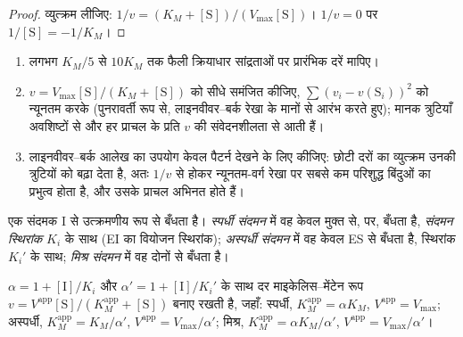 \begin{proof}
व्युत्क्रम लीजिए: $1/v = (K_M + [\mathrm S])/(V_{\max}[\mathrm S])$। $1/v = 0$ पर $1/[\mathrm S] = -1/K_M$।
\end{proof}

\begin{method}\label{met:b3:complex-kinetics:mm-fit}
\begin{enumerate}
  \item लगभग $K_M/5$ से $10K_M$ तक फैली क्रियाधार सांद्रताओं पर
        प्रारंभिक दरें मापिए।
  \item $v = V_{\max}[\mathrm S]/(K_M + [\mathrm S])$ को सीधे समंजित कीजिए, $\sum(v_i - v(\mathrm S_i))^2$ को न्यूनतम करके (पुनरावर्ती रूप से,
        लाइनवीवर--बर्क रेखा के मानों से आरंभ करते हुए); मानक
        त्रुटियाँ अवशिष्टों से और हर प्राचल के प्रति $v$ की
        संवेदनशीलता से आती हैं।
  \item लाइनवीवर--बर्क आलेख का उपयोग केवल पैटर्न देखने के लिए कीजिए: छोटी
        दरों का व्युत्क्रम उनकी त्रुटियों को बढ़ा देता है, अतः $1/v$ से होकर न्यूनतम-वर्ग रेखा
        पर सबसे कम परिशुद्ध बिंदुओं का प्रभुत्व होता है, और उसके प्राचल
        अभिनत होते हैं।
\end{enumerate}
\end{method}

\begin{definition}[संदमन]\label{def:b3:complex-kinetics:inhibition}
एक संदमक I  से उत्क्रमणीय रूप से बँधता है। \emph{स्पर्धी
संदमन} में वह केवल मुक्त  से,  पर, बँधता है, \emph{संदमन स्थिरांक} $K_i$ के साथ
(EI का वियोजन स्थिरांक); \emph{अस्पर्धी संदमन}
में वह केवल ES से बँधता है, स्थिरांक $K_i'$ के साथ; \emph{मिश्र
संदमन} में वह दोनों से बँधता है।
\end{definition}

\begin{proposition}[संदमित दर नियम]\label{prop:b3:complex-kinetics:inhibition-laws}
$\alpha = 1 + [\mathrm I]/K_i$ और $\alpha' = 1 + [\mathrm I]/K_i'$ के साथ दर
माइकेलिस--मेंटेन रूप $v = V^{\mathrm{app}}[\mathrm S]/(K_M^{\mathrm{app}} + [\mathrm S])$ बनाए रखती है, जहाँ: स्पर्धी,
$K_M^{\mathrm{app}} = \alpha K_M$, $V^{\mathrm{app}} = V_{\max}$; अस्पर्धी, $K_M^{\mathrm{app}} = K_M/\alpha'$, $V^{\mathrm{app}} =
V_{\max}/\alpha'$; मिश्र, $K_M^{\mathrm{app}} = \alpha K_M/\alpha'$, $V^{\mathrm{app}} = V_{\max}/\alpha'$।
\end{proposition}

